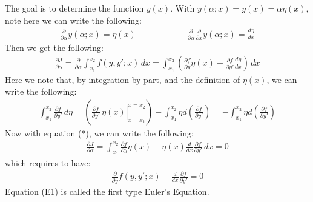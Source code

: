 \documentclass[11pt,oneside]{book}
\theoremstyle{break}
\theoremstyle{break}
\begin{document}
The goal is to determine the function $y(x)$. With $y(\alpha; x) = y(x) = \alpha\eta(x) $, note here we can write the following:
\begin{align*}
\frac{\partial }{\partial \alpha} y(\alpha; x) = \eta(x) \qquad\qquad \qquad \frac{\partial}{\partial \alpha} \frac{\partial }{\partial x} y(\alpha; x) = \frac{d\eta}{dx}
\end{align*}
Then we get the following:
\begin{align*}
\frac{\partial J}{\partial \alpha} = \frac{\partial }{\partial \alpha} \int_{x_1}^{x_2} f(y, y'; x) \, dx = \int_{x_1}^{x_2} \left( \frac{\partial f}{\partial y}\eta(x) + \frac{\partial f}{\partial y'}\frac{d\eta}{dx}\right) \, dx \tag{*}
\end{align*}
Here we note that, by integration by part, and the definition of $\eta(x)$, we can write the following:
\begin{align*}
\int_{x_1}^{x_2} \frac{\partial f}{\partial y'}\, d\eta =\left(\left. \frac{\partial f}{\partial y'}\, \eta(x)\right|_{x=x_1}^{x=x_2} \right)- \int_{x_1}^{x_2}\eta d\left(\frac{\partial f}{\partial y'} \right) = -\int_{x_1}^{x_2}\eta d\left(\frac{\partial f}{\partial y'} \right) 
\end{align*}
Now with equation (*), we can write the following:
\begin{align*}
\frac{\partial J}{\partial \alpha} = \int_{x_1}^{x_2}\frac{\partial f}{\partial y}\eta(x) - \eta(x) \frac{d}{dx}\frac{\partial f}{\partial y'}\, dx = 0
\end{align*}
which requires to have:
\begin{align*}
\frac{\partial }{\partial y} f(y, y'; x) - \frac{d}{dx}\frac{\partial f}{\partial y'} = 0 \tag{E1}
\end{align*}
Equation (E1) is called the first type Euler's Equation.\\
\end{document}
